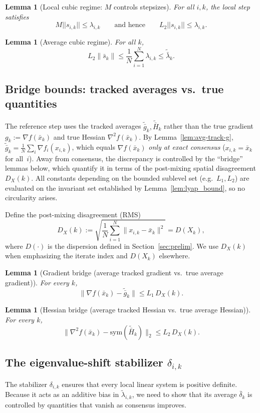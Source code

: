 \documentclass[10pt,twocolumn,letterpaper]{article}
\def\norm#1{||#1||}%
\theoremstyle{compact}
\newtheorem{lemma}[theorem]{Lemma}
\theoremstyle{compactremark}
\newcommand{\norm}[1]{\left\|#1\right\|}
\begin{document}
\begin{lemma}[Local cubic regime: $M$ controls stepsizes]\label{lem:M-vs-s}
For all $i,k$, the local step satisfies
\[
M\norm{s_{i,k}}\le \lambda_{i,k}
\qquad\text{and hence}\qquad
L_2\norm{s_{i,k}}\le \lambda_{i,k}.
\]
\end{lemma}

\begin{lemma}[Average cubic regime]\label{lem:avg-regime}
For all $k$,
\[
L_2\|\bar s_k\|\le \frac1N\sum_{i=1}^N \lambda_{i,k}\le \tilde{\bar\lambda}_k.
\]
\end{lemma}

\subsection{Bridge bounds: tracked averages vs.\ true quantities}\label{ssec:bridge}
The reference step uses the tracked averages
$\tilde{\bar g}_k,\tilde{\bar H}_k$ rather than the true gradient
$g_k:=\nabla f(\bar x_k)$ and true Hessian
$\nabla^2 f(\bar x_k)$.
By Lemma~\ref{lem:avg-track-g},
$\tilde{\bar g}_k = \frac{1}{N}\sum_{i}\nabla f_i(x_{i,k})$,
which equals $\nabla f(\bar x_k)$ \emph{only at exact consensus}
($x_{i,k}=\bar x_k$ for all~$i$).
Away from consensus, the discrepancy is controlled by the
``bridge'' lemmas below, which quantify it in terms of the
post-mixing spatial disagreement $D_X(k)$.
All constants depending on the bounded sublevel set
(e.g.\ $L_1,L_2$) are evaluated on the invariant set
established by Lemma~\ref{lem:lyap_bound}, so no circularity arises.

Define the post-mixing disagreement (RMS)
\[
D_X(k):=\sqrt{\frac1N\sum_{i=1}^N \|x_{i,k}-\bar x_k\|^2}
= D(X_k),
\]
where $D(\cdot)$ is the dispersion defined in Section~\ref{sec:prelim}.
We use $D_X(k)$ when emphasizing the iterate index and $D(X_k)$ elsewhere.

\begin{lemma}[Gradient bridge (average tracked gradient vs.\ true average gradient)]\label{lem:bridge-grad}
For every $k$,
\[
\|\nabla f(\bar x_k)-\tilde{\bar g}_k\|\le L_1\,D_X(k).
\]
\end{lemma}

\begin{lemma}[Hessian bridge (average tracked Hessian vs.\ true average Hessian)]\label{lem:bridge-hess}
For every $k$,
\[
\|\nabla^2 f(\bar x_k)-\mathrm{sym}(\tilde{\bar H}_k)\|_2\le L_2\,D_X(k).
\]
\end{lemma}

\subsection{The eigenvalue-shift stabilizer \texorpdfstring{$\delta_{i,k}$}{delta\_ik}}\label{ssec:stab}
The stabilizer $\delta_{i,k}$ ensures that every local linear system
is positive definite.
Because it acts as an additive bias in $\tilde\lambda_{i,k}$, we need
to show that its average $\bar\delta_k$ is controlled by quantities
that vanish as consensus improves.
\end{document}
